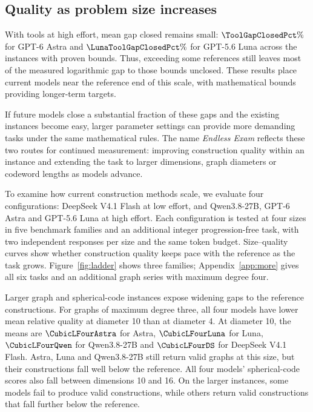 \documentclass{article}
\begin{document}
\subsection{Quality as problem size increases}
\label{sec:ladder}
With tools at high effort, mean gap closed remains small: $\ToolGapClosedPct\%$ for GPT-6 Astra and $\LunaToolGapClosedPct\%$ for GPT-5.6 Luna across the \GapN{} instances with proven bounds. Thus, exceeding some references still leaves most of the measured logarithmic gap to those bounds unclosed. These results place current models near the reference end of this scale, with mathematical bounds providing longer-term targets.

If future models close a substantial fraction of these gaps and the existing instances become easy, larger parameter settings can provide more demanding tasks under the same mathematical rules. The name \emph{Endless Exam} reflects these two routes for continued measurement: improving construction quality within an instance and extending the task to larger dimensions, graph diameters or codeword lengths as models advance.

To examine how current construction methods scale, we evaluate four configurations: DeepSeek V4.1 Flash at low effort, and Qwen3.8-27B, GPT-6 Astra and GPT-5.6 Luna at high effort. Each configuration is tested at four sizes in five benchmark families and an additional integer progression-free task, with two independent responses per size and the same token budget. Size--quality curves show whether construction quality keeps pace with the reference as the task grows. Figure~\ref{fig:ladder} shows three families; Appendix~\ref{app:more} gives all six tasks and an additional graph series with maximum degree four.

Larger graph and spherical-code instances expose widening gaps to the reference constructions. For graphs of maximum degree three, all four models have lower mean relative quality at diameter 10 than at diameter 4. At diameter 10, the means are $\CubicLFourAstra$ for Astra, $\CubicLFourLuna$ for Luna, $\CubicLFourQwen$ for Qwen3.8-27B and $\CubicLFourDS$ for DeepSeek V4.1 Flash. Astra, Luna and Qwen3.8-27B still return valid graphs at this size, but their constructions fall well below the reference. All four models' spherical-code scores also fall between dimensions 10 and 16. On the larger instances, some models fail to produce valid constructions, while others return valid constructions that fall further below the reference.
\end{document}
